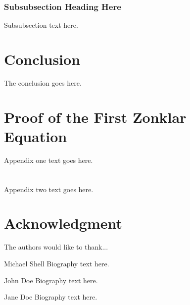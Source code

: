 \documentclass[journal]{IEEEtran}
\begin{document}
\subsubsection{Subsubsection Heading Here}
Subsubsection text here.

















\section{Conclusion}
The conclusion goes here.










\appendices
\section{Proof of the First Zonklar Equation}
Appendix one text goes here.

\section{}
Appendix two text goes here.


\section*{Acknowledgment}


The authors would like to thank...


\ifCLASSOPTIONcaptionsoff
  \newpage
\fi










\begin{IEEEbiography}{Michael Shell}
Biography text here.
\end{IEEEbiography}

\begin{IEEEbiographynophoto}{John Doe}
Biography text here.
\end{IEEEbiographynophoto}



\begin{IEEEbiographynophoto}{Jane Doe}
Biography text here.
\end{IEEEbiographynophoto}
\end{document}
